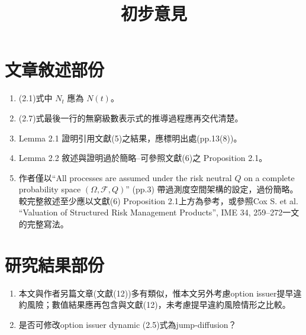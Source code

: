 \documentclass[12pt,a4paper]{article}
\begin{document}
\title{初步意見}
\author{}
\maketitle

\section{文章敘述部份}

\begin{enumerate}
  \item (2.1)式中 $N_t$ 應為 $N(t)$。
  \item (2.7)式最後一行的無窮級數表示式的推導過程應再交代清楚。
  \item Lemma 2.1 證明引用文獻(5)之結果，應標明出處(pp.13(8))。
  \item Lemma 2.2 敘述與證明過於簡略--可參照文獻(6)之 Proposition 2.1。 
  \item 作者僅以``All processes are assumed under the risk neutral $Q$ on a complete probability space $(\Omega, \mathcal{F}, Q)$'' (pp.3) 帶過測度空間架構的設定，過份簡略。較完整敘述至少應以文獻(6) Proposition 2.1上方為參考，或參照Cox S. et al. ``Valuation of Structured Risk Management Products'', IME 34, 259--272一文的完整寫法。
\end{enumerate}

\section{研究結果部份}
\begin{enumerate}
  \item 本文與作者另篇文章(文獻(12))多有類似，惟本文另外考慮option issuer提早違約風險；數值結果應再包含與文獻(12)，未考慮提早違約風險情形之比較。
  \item 是否可修改option issuer dynamic (2.5)式為jump-diffusion？
\end{enumerate}
\end{document}
